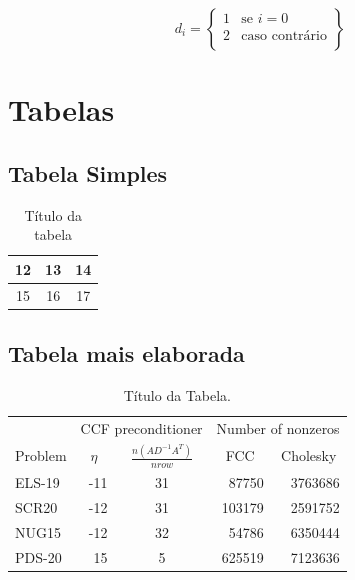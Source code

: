 \documentclass[12pt,fleqn]{article}
\begin{document}
\[
d_i=\left \{
\begin{array}{cc}
1 & \mbox{se } i=0 \\
2 & \mbox{caso contrário}\\
\end{array}
\right \}
\]

\clearpage

\section{Tabelas}
\label{sec:tab}


\subsection{Tabela Simples}
\begin{table}[htb]
\begin{center}
		\begin{tabular}{|c|c|c|}\hline
		12  & 13 & 14 \\\hline
		15  & 16 & 17 \\\hline
		\end{tabular}
\label{tab:Tabela1}
\caption{Título da tabela}
\end{center}
\end{table}


\subsection{Tabela mais elaborada}
\begin{table}[htb]
\begin{center}
\begin{tabular}{|l|r|c|r|r|} \hline
            & \multicolumn{2}{|c|}{{CCF preconditioner}} & \multicolumn{2}{|c|}{{Number of nonzeros}} \\ \cline{2-5}
{Problem}   & \multicolumn{1}{|c|}{$\eta$}  & \multicolumn{1}{|c|}{$ \frac{n(AD^{-1}A^T)}{nrow}$} & \multicolumn{1}{|c|}{FCC} & \multicolumn{1}{|c|}{Cholesky}  \\ \hline \hline
ELS-19    &  -11 & 31 &  87750  & 3763686  \\\hline
SCR20     &  -12 & 31 &  103179 & 2591752  \\\hline
NUG15     &  -12 & 32 &  54786  & 6350444 \\\hline
PDS-20    &   15 & 5  &  625519 & 7123636\\\hline
\end{tabular}
\caption{Título da Tabela.}
\label{tabn}
\end{center}
\end{table}
\end{document}
